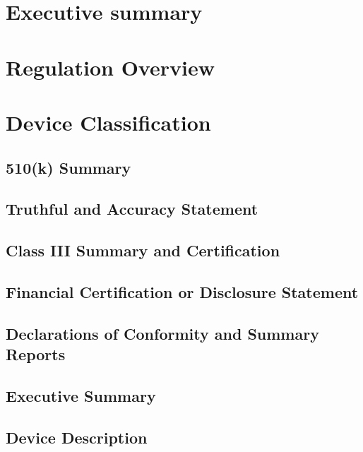 \documentclass{article}
\begin{document}

\setcounter{tocdepth}{3}
\tableofcontents
\newpage

\section*{Executive summary}
\label{sec:exec-summary}

\section{Regulation Overview}
\label{sec:test-administration}

\section{Device Classification}
\label{sec:protocols}





\setcounter{subsection}{0}


\subsection{510(k) Summary}
\subsection{Truthful and Accuracy Statement}
\subsection{Class III Summary and Certification}
\subsection{Financial Certification or Disclosure Statement}
\subsection{Declarations of Conformity and Summary Reports}
\subsection{Executive Summary}
\subsection{Device Description}
\end{document}

